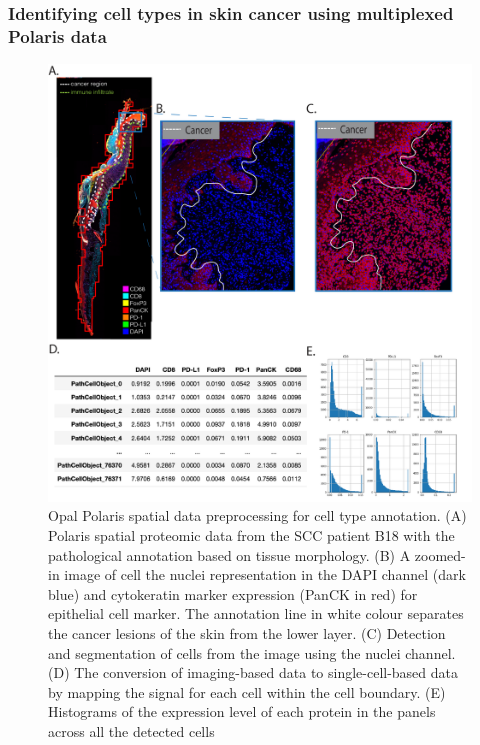 \subsubsection{Identifying cell types in skin cancer using multiplexed Polaris data}
\begin{figure}[htp]
    \centering
    \includegraphics[width=\columnwidth]{Chapter3/Figures/Chap3_Figure1_1.png}
    \caption[Schematic of spatial data preprocessing for cell type annotation.]{ Opal Polaris spatial data preprocessing for cell type annotation. (A) Polaris spatial proteomic data from the SCC patient B18 with the pathological annotation based on tissue morphology. (B) A zoomed-in image of cell the nuclei representation in the DAPI channel (dark blue) and cytokeratin marker expression (PanCK in red) for epithelial cell marker. The annotation line in white colour separates the cancer lesions of the skin from the lower layer. (C) Detection and segmentation of cells from the image using the nuclei channel. (D) The conversion of imaging-based data to single-cell-based data by mapping the signal for each cell within the cell boundary. (E) Histograms of the expression level of each protein in the panels across all the detected cells}
    \label{fig:Polaris_skin_cancer_preprocessing}
\end{figure}

